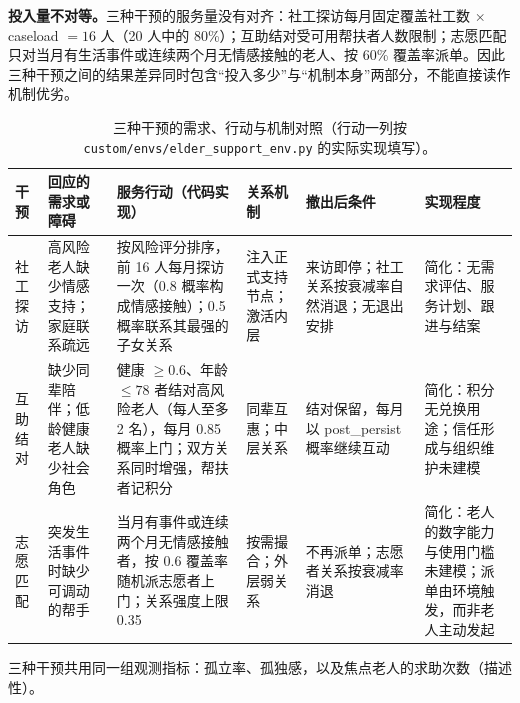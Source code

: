 \documentclass[10.5pt,twocolumn]{ctexart}
\begin{document}
\textbf{投入量不对等。}三种干预的服务量没有对齐：社工探访每月固定覆盖社工数 $\times$ caseload $=16$ 人（20 人中的 80\%）；互助结对受可用帮扶者人数限制；志愿匹配只对当月有生活事件或连续两个月无情感接触的老人、按 60\% 覆盖率派单。因此三种干预之间的结果差异同时包含``投入多少''与``机制本身''两部分，不能直接读作机制优劣。

\begin{table}[t]
\centering\small
\caption{三种干预的需求、行动与机制对照（行动一列按 \texttt{custom/envs/elder\_support\_env.py} 的实际实现填写）。}
\label{tab:mechanism}
\setlength{\tabcolsep}{4pt}
\begin{tabular}{@{}p{}p{}p{}p{}p{}p{}@{}}
\toprule
干预 & 回应的需求或障碍 & 服务行动（代码实现） & 关系机制 & 撤出后条件 & 实现程度 \\
\midrule
社工探访 & 高风险老人缺少情感支持；家庭联系疏远 & 按风险评分排序，前 16 人每月探访一次（0.8 概率构成情感接触）；0.5 概率联系其最强的子女关系 & 注入正式支持节点；激活内层 & 来访即停；社工关系按衰减率自然消退；无退出安排 & 简化：无需求评估、服务计划、跟进与结案 \\
互助结对 & 缺少同辈陪伴；低龄健康老人缺少社会角色 & 健康 $\ge0.6$、年龄 $\le78$ 者结对高风险老人（每人至多 2 名），每月 0.85 概率上门；双方关系同时增强，帮扶者记积分 & 同辈互惠；中层关系 & 结对保留，每月以 post\_persist 概率继续互动 & 简化：积分无兑换用途；信任形成与组织维护未建模 \\
志愿匹配 & 突发生活事件时缺少可调动的帮手 & 当月有事件或连续两个月无情感接触者，按 0.6 覆盖率随机派志愿者上门；关系强度上限 0.35 & 按需撮合；外层弱关系 & 不再派单；志愿者关系按衰减率消退 & 简化：老人的数字能力与使用门槛未建模；派单由环境触发，而非老人主动发起 \\
\bottomrule
\end{tabular}
\smallskip

{\footnotesize 三种干预共用同一组观测指标：孤立率、孤独感，以及焦点老人的求助次数（描述性）。}
\end{table}
\end{document}
